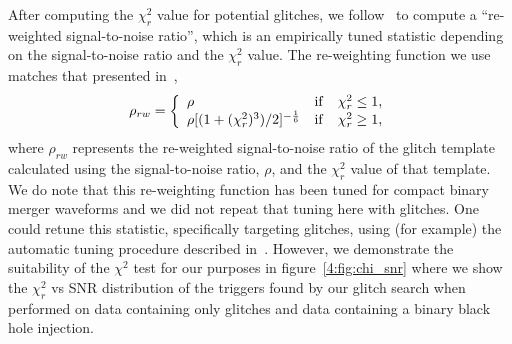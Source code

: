 After computing the $\chi_{r}^{2}$ value for potential \scl{} glitches, we follow~\cite{rw_snr_eq:2012} to compute a ``re-weighted signal-to-noise ratio'', which is an empirically tuned statistic depending on the signal-to-noise ratio and the $\chi_{r}^{2}$ value.  The re-weighting function we use matches that presented in~\cite{rw_snr_eq:2012},
%
\begin{equation}
\rho_{rw} =  \left\{  \begin{array}{l@{\quad}cr} 
\rho & \mathrm{if} & \chi_{r}^{2} \leq 1, \\  
\rho [(1 + (\chi_{r}^{2})^3)/2]^{-\frac{1}{6}} &  \mathrm{if} & \chi_{r}^{2} \ge 1,   
\end{array}\right.
\label{4:eqn:reweighting}
\end{equation}
%
where $\rho_{rw}$ represents the re-weighted signal-to-noise ratio of the \scl{} glitch template calculated using the signal-to-noise ratio, $\rho$, and the $\chi_{r}^{2}$ value of that template.
We do note that this re-weighting function has been tuned for compact binary merger waveforms and we did not repeat that tuning here with \scl{} glitches. One could retune this statistic, specifically targeting \scl{} glitches, using (for example) the automatic tuning procedure described in~\cite{McIsaac_Chi:2022}. However, we demonstrate the suitability of the $\chi^{2}$ test for our purposes in figure~\ref{4:fig:chi_snr} where we show the $\chi_{r}^{2}$ vs SNR distribution of the triggers found by our \scl{} glitch search when performed on data containing only \scl{} glitches and data containing a binary black hole \gw{} injection.

